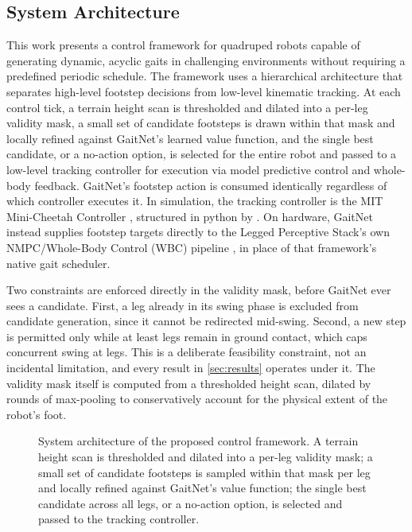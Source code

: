 \subsection{System Architecture}
\label{subsec:methodology-system-overview}

This work presents a control framework for quadruped robots capable
of generating dynamic, acyclic gaits in challenging environments
without requiring a predefined periodic schedule. The framework uses
a hierarchical architecture that separates high-level footstep
decisions from low-level kinematic tracking. At each control
tick, a terrain height scan is thresholded and dilated into a
per-leg validity mask, a small set of candidate footsteps is drawn
within that mask and locally refined against GaitNet's learned value
function, and the single best candidate, or a no-action
option, is selected for the entire robot and passed to a
low-level tracking controller for execution via model predictive
control and whole-body feedback. GaitNet's footstep action is
consumed identically regardless of which controller executes it.
In simulation, the tracking controller is the MIT Mini-Cheetah
Controller \cite{di_mini_cheetah_2020}, structured in python by
\cite{zhuang_rl_mpc_locomotion_2025}. On hardware, GaitNet instead
supplies footstep targets directly to the Legged Perceptive Stack's
own NMPC/Whole-Body Control (WBC) pipeline
\cite{leggedperceptive}, in place of that framework's
native gait scheduler.

Two constraints are enforced directly in the validity mask, before
GaitNet ever sees a candidate. First, a leg already in its swing
phase is excluded from candidate generation, since it cannot be
redirected mid-swing. Second, a new step is permitted only while at
least \numberstringnum{\corlMinContactLegs} legs remain in ground
contact, which caps concurrent swing at
\numberstringnum{\corlMaxConcurrentSwingLegs} legs. This is a
deliberate feasibility constraint, not an incidental limitation, and
every result in \autoref{sec:results} operates under it. The validity
mask itself is computed from a thresholded height scan, dilated by
\numberstringnum{\corlMaskDilationRounds} rounds of max-pooling to
conservatively account for the physical extent of the robot's foot.

\begin{figure}[t]
  \centering
  \caption{System architecture of the proposed control framework. A
    terrain height scan is thresholded and dilated into a per-leg
    validity mask; a small set of candidate footsteps is sampled
    within that mask per leg and locally refined against GaitNet's
    value function; the single best candidate across all legs, or a
    no-action option, is selected and passed to the tracking controller.}
  \label{fig:diagram-control-system}
\end{figure}

